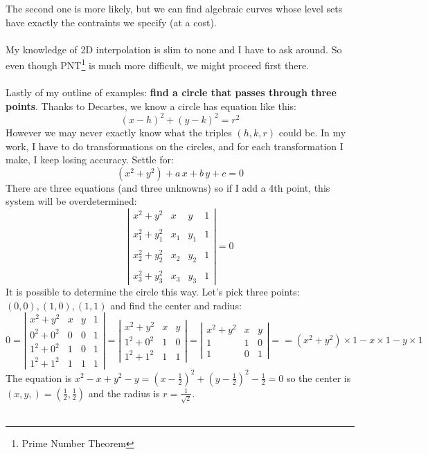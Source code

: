 \documentclass[12pt]{article}
\begin{document}
The second one is more likely, but we can find algebraic curves whose level sets have exactly the contraints we specify (at a cost). \\ \\
My knowledge of 2D interpolation is slim to none and I have to ask around.  So even though PNT\footnote{Prime Number Theorem} is much more difficult, we might proceed first there. \\ \\
Lastly of my outline of examples: \textbf{find a circle that passes through three points}.  Thanks to Decartes, we know a circle has equation like this:
$$ (x - h)^2 + (y- k)^2 = r^2$$
However we may never exactly know what the triples $(h,k,r)$ could be.  In my work, I have to do transformations on the circles, and for each transformation I make, I keep losing accuracy.  Settle for:
$$ (x^2 + y^2) + a\,x + b\,y + c = 0 $$
There are three equations (and three unknowns) so if I add a 4th point, this system will be overdetermined:
$$ \left|
\begin{array}{cllc}
x^2 + y^2 & x & y & 1 \\ \\
x_1^2 + y_1^2 & x_1 & y_1 & 1 \\ \\
x_2^2 + y_2^2 & x_2 & y_2 & 1 \\ \\
x_3^2 + y_3^2 & x_3 & y_3 & 1 \end{array} \right| = 0 $$
It is possible to determine the circle this way.  Let's pick three points: $(0,0),(1,0),(1,1)$ and find the center and radius:
$$ 0 = \left|
\begin{array}{cllc}
x^2 + y^2 & x & y & 1 \\ 
0^2 + 0^2 & 0 & 0 & 1 \\ 
1^2 + 0^2 & 1 & 0 & 1 \\ 
1^2 + 1^2 & 1 & 1 & 1 \end{array} \right| =
\left|
\begin{array}{cll}
x^2 + y^2 & x & y  \\ 
1^2 + 0^2 & 1 & 0  \\ 
1^2 + 1^2 & 1 & 1  \end{array} \right| =
\left|
\begin{array}{cll}
x^2 + y^2 & x & y  \\ 
1 & 1 & 0  \\ 
1 & 0 & 1  \end{array} \right| =
 =(x^2 + y^2) \times 1 - x \times 1  - y \times 1$$
The equation is $x^2 - x + y^2 - y= (x - \frac{1}{2})^2 + (y - \frac{1}{2})^2 - \frac{1}{2}= 0$ so the center is $(x,y,) = (\frac{1}{2},\frac{1}{2})$ and the radius is $r = \frac{1}{\sqrt{2}}$. \\ \\
\end{document}
